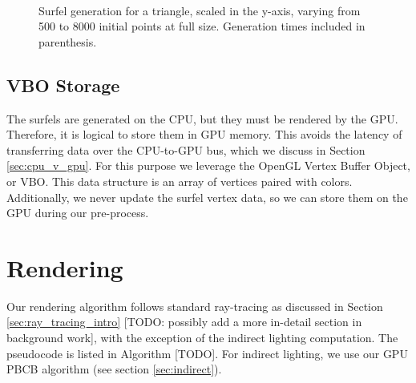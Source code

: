 \begin{figure}[h!]
   \\
   \captionfonts
   \caption[Triangle surfels at full size]{Surfel generation for a triangle, scaled in the y-axis, varying from 500 to 8000 initial points at full size. Generation times included in parenthesis.}
   \label{fig:triangle_surfels}
\end{figure}

\subsection{VBO Storage}
\label{sec:VBOStorage}

The surfels are generated on the CPU, but they must be rendered by the GPU. Therefore, it is logical to store them in GPU memory. This avoids the latency of transferring data over the CPU-to-GPU bus, which we discuss in Section \ref{sec:cpu_v_gpu}. For this purpose we leverage the OpenGL Vertex Buffer Object, or VBO. This data structure is an array of vertices paired with colors. Additionally, we never update the surfel vertex data, so we can store them on the GPU during our pre-process.

\section{Rendering}
\label{sec:rendering}
Our rendering algorithm follows standard ray-tracing as discussed in Section \ref{sec:ray_tracing_intro} [TODO: possibly add a more in-detail section in background work], with the exception of the indirect lighting computation. The pseudocode is listed in Algorithm [TODO]. For indirect lighting, we use our GPU PBCB algorithm (see section \ref{sec:indirect}).

